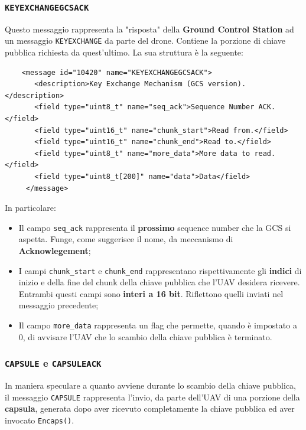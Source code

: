 \documentclass[a4paper, 12pt, oneside]{article}
\theoremstyle{definition}
\begin{document}
\subsubsection{\texttt{KEYEXCHANGEGCSACK}}
Questo messaggio rappresenta la "risposta" della \textbf{Ground Control Station} ad un messaggio \texttt{KEYEXCHANGE} da parte del drone. Contiene la porzione di chiave pubblica richiesta da quest'ultimo. La sua struttura è la seguente:


\begin{verbatim}
    <message id="10420" name="KEYEXCHANGEGCSACK">
       <description>Key Exchange Mechanism (GCS version).</description>
       <field type="uint8_t" name="seq_ack">Sequence Number ACK.</field>
       <field type="uint16_t" name="chunk_start">Read from.</field>
       <field type="uint16_t" name="chunk_end">Read to.</field>
       <field type="uint8_t" name="more_data">More data to read.</field>
       <field type="uint8_t[200]" name="data">Data</field>
     </message>
\end{verbatim}

In particolare:

\begin{itemize}
    \item Il campo \texttt{seq\_ack} rappresenta il \textbf{prossimo} sequence number che la GCS si aspetta. Funge, come suggerisce il nome, da meccanismo di \textbf{Acknowlegement};
    \item I campi \texttt{chunk\_start} e \texttt{chunk\_end} rappresentano rispettivamente gli \textbf{indici} di inizio e della fine del chunk della chiave pubblica che l'UAV desidera ricevere. Entrambi questi campi sono \textbf{interi a 16 bit}. Riflettono quelli inviati nel messaggio precedente;
    \item Il campo \texttt{more\_data} rappresenta un flag che permette, quando è impostato a 0, di avvisare l'UAV che lo scambio della chiave pubblica è terminato.
\end{itemize}

\subsubsection{\texttt{CAPSULE} e \texttt{CAPSULEACK}}
In maniera speculare a quanto avviene durante lo scambio della chiave pubblica, il messaggio \texttt{CAPSULE} rappresenta l'invio, da parte dell'UAV di una porzione della \textbf{capsula}, generata dopo aver ricevuto completamente la chiave pubblica ed aver invocato \texttt{Encaps()}.
\end{document}
